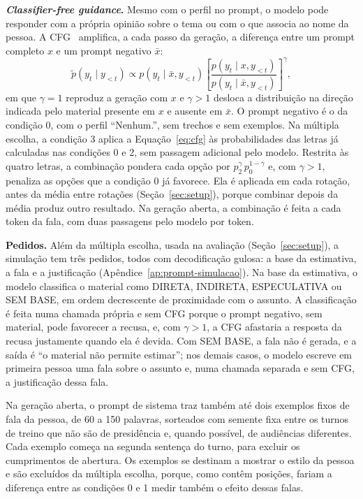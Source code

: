 \textbf{\textit{Classifier-free guidance}.} Mesmo com o perfil no prompt, o modelo pode responder com a
própria opinião sobre o tema ou com o que associa ao nome da pessoa. A
CFG~\citep{ho2022classifier,sanchez2024stay} amplifica, a cada passo da geração, a diferença entre um
prompt completo $x$ e um prompt negativo $\bar{x}$:
\begin{equation}
  \tilde{p}(y_t \mid y_{<t}) \propto p(y_t \mid \bar{x}, y_{<t})
  \left[ \frac{p(y_t \mid x, y_{<t})}{p(y_t \mid \bar{x}, y_{<t})} \right]^{\gamma},
  \label{eq:cfg}
\end{equation}
em que $\gamma = 1$ reproduz a geração com $x$ e $\gamma > 1$ desloca a distribuição na direção
indicada pelo material presente em $x$ e ausente em $\bar{x}$. O prompt negativo é o da condição 0,
com o perfil ``Nenhum.'', sem trechos e sem exemplos. Na múltipla escolha, a condição 3 aplica a
Equação~\ref{eq:cfg} às probabilidades das letras já calculadas nas condições 0 e 2, sem passagem
adicional pelo modelo. Restrita às quatro letras, a combinação pondera cada opção por
$p_2^{\gamma}\, p_0^{1-\gamma}$ e, com $\gamma > 1$, penaliza as opções que a condição 0 já favorece.
Ela é aplicada em cada rotação, antes da média entre rotações (Seção~\ref{sec:setup}), porque
combinar depois da média produz outro resultado. Na geração aberta, a combinação é feita a cada token da fala, com duas passagens pelo
modelo por token.

\textbf{Pedidos.} Além da múltipla escolha, usada na avaliação (Seção~\ref{sec:setup}), a simulação
tem três pedidos, todos com decodificação gulosa: a base da estimativa, a fala e a justificação
(Apêndice~\ref{ap:prompt-simulacao}). Na base da estimativa, o modelo classifica o material como
DIRETA, INDIRETA, ESPECULATIVA ou SEM BASE, em ordem decrescente de proximidade com o assunto. A classificação
é feita numa chamada própria e sem CFG porque o prompt negativo, sem material, pode favorecer a
recusa, e, com $\gamma > 1$, a CFG afastaria a resposta da recusa justamente quando ela é devida. Com
SEM BASE, a fala não é gerada, e a saída é ``o material não permite estimar''; nos demais casos, o
modelo escreve em primeira pessoa uma fala sobre o assunto e, numa chamada separada e sem CFG, a
justificação dessa fala.

Na geração aberta, o prompt de sistema traz também até dois exemplos fixos de fala da pessoa, de 60 a
150 palavras, sorteados com semente fixa entre os turnos de treino que não são de presidência e,
quando possível, de audiências diferentes. Cada exemplo começa na segunda sentença do turno, para
excluir os cumprimentos de abertura. Os exemplos se destinam a mostrar o estilo da pessoa e são
excluídos da múltipla escolha, porque, como contêm posições, fariam a diferença entre as condições 0
e 1 medir também o efeito dessas falas.

